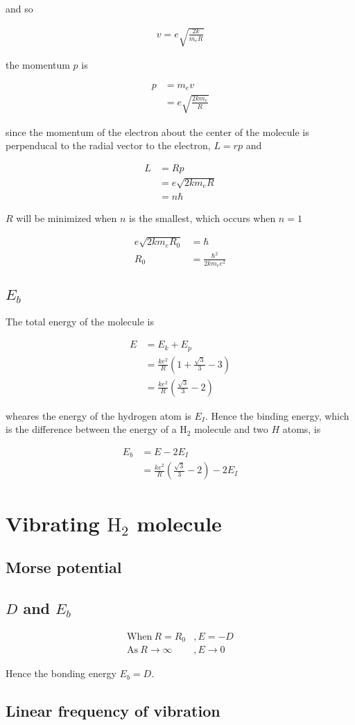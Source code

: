 \documentclass{article}
\begin{document}
and so

\begin{align*}
v = e\sqrt{\frac{2k}{m_e R}}
\end{align*}

the momentum $p$ is

\begin{align*}
p &= m_e v \\
&= e\sqrt{\frac{2km_e}{R}}
\end{align*}

since the momentum of the electron about the center of the molecule is perpenducal to the radial vector to the electron, $L = rp$ and

\begin{align*}
L &= R p \\
&= e\sqrt{2km_eR} \\
&= n\hbar
\end{align*}

$R$ will be minimized when $n$ is the smallest, which occurs when $n=1$

\begin{align*}
e\sqrt{2km_eR_0} &= \hbar \\
R_0 &= \frac{\hbar^2}{2km_e e^2}
\end{align*}

\subsection{$E_b$}

The total energy of the molecule is

\begin{align*}
E &= E_k + E_p \\
&= \frac{ke^2}{R} \left(1 + \frac{\sqrt 3}{3} - 3\right) \\
&= \frac{ke^2}{R} \left(\frac{\sqrt 3}{3} - 2\right)
\end{align*}

wheares the energy of the hydrogen atom is $E_I$. Hence the binding energy, which is the difference between the energy of a $\mathrm{H_2}$ molecule and two $H$ atoms, is

\begin{align*}
E_b &= E - 2 E_I \\
&= \frac{ke^2}{R} \left(\frac{\sqrt 3}{3} - 2\right) - 2 E_I
\end{align*}

\section{Vibrating $\mathrm{H_2}$ molecule}

\subsection{Morse potential}
\subsection{$D$ and $E_b$}

\begin{align*}
\mathrm{When}\ R = R_0&, E = -D \\
\mathrm{As}\ R \rightarrow \infty&, E \rightarrow 0
\end{align*}

Hence the bonding energy $E_b = D$.

\subsection{Linear frequency of vibration}
\end{document}
